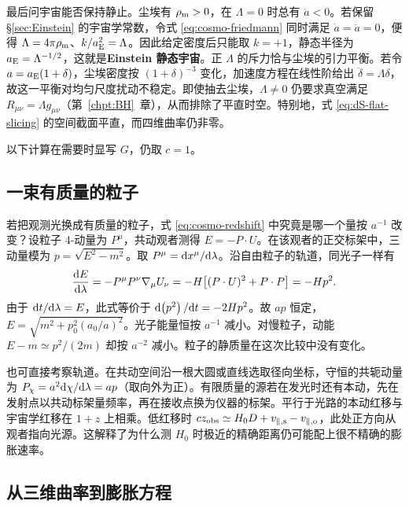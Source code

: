 最后问宇宙能否保持静止。尘埃有 $\rho_{\rm m}>0$，在 $\Lambda=0$ 时总有 $\ddot a<0$。若保留 \S\ref{sec:Einstein} 的宇宙学常数，令式 \eqref{eq:cosmo-friedmann} 同时满足 $\dot a=\ddot a=0$，便得 $\Lambda=4\pi\rho_{\rm m}$、$k/a_{\rm E}^2=\Lambda$。因此给定密度后只能取 $k=+1$，静态半径为 $a_{\rm E}=\Lambda^{-1/2}$，这就是\textbf{Einstein 静态宇宙}。正 $\Lambda$ 的斥力恰与尘埃的引力平衡。若令 $a=a_{\rm E}(1+\delta)$，尘埃密度按 $(1+\delta)^{-3}$ 变化，加速度方程在线性阶给出 $\ddot\delta=\Lambda\delta$，故这一平衡对均匀尺度扰动不稳定。即使抽去尘埃，$\Lambda\ne0$ 仍要求真空满足 $R_{\mu\nu}=\Lambda g_{\mu\nu}$（第~\ref{chpt:BH}~章），从而排除了平直时空。特别地，式 \eqref{eq:dS-flat-slicing} 的空间截面平直，而四维曲率仍非零。

以下计算在需要时显写 $G$，仍取 $c=1$。

\subsection{一束有质量的粒子}

若把观测光换成有质量的粒子，式 \eqref{eq:cosmo-redshift} 中究竟是哪一个量按 $a^{-1}$ 改变？设粒子 4-动量为 $P^\mu$，共动观者测得 $E=-P\cdot U$。在该观者的正交标架中，三动量模为 $p=\sqrt{E^2-m^2}$。取 $P^\mu=\dd x^\mu/\dd\lambda$。沿自由粒子的轨道，同光子一样有
\[
 \frac{\dd E}{\dd\lambda}=-P^\mu P^\nu\nabla_\mu U_\nu
       =-H\big[(P\cdot U)^2+P\cdot P\big]=-Hp^2 .
\]
由于 $\dd t/\dd\lambda=E$，此式等价于 $\dd(p^2)/\dd t=-2Hp^2$。故 $ap$ 恒定，$E=\sqrt{m^2+p_0^2(a_0/a)^2}$。光子能量恒按 $a^{-1}$ 减小。对慢粒子，动能 $E-m\simeq p^2/(2m)$ 却按 $a^{-2}$ 减小。粒子的静质量在这次比较中没有变化。

也可直接考察轨道。在共动空间沿一根大圆或直线选取径向坐标，守恒的共轭动量为 $P_\chi=a^2\dd\chi/\dd\lambda=ap$（取向外为正）。有限质量的源若在发光时还有本动，先在发射点以共动标架量频率，再在接收点换为仪器的标架。平行于光路的本动红移与宇宙学红移在 $1+z$ 上相乘。低红移时 $cz_{\rm obs}\simeq H_0D+v_{\parallel,\rm s}-v_{\parallel,\rm o}$，此处正方向从观者指向光源。这解释了为什么测 $H_0$ 时极近的精确距离仍可能配上很不精确的膨胀速率。

\subsection{从三维曲率到膨胀方程}

